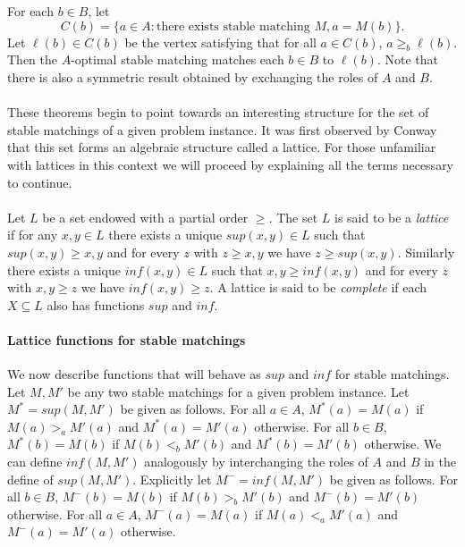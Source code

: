 \begin{corollary}For each $b \in B$, let $$C(b) = \{a \in A: \text{there exists stable matching }M, a = M(b)\}.$$ Let $\ell(b) \in C(b)$  be the vertex satisfying that for all $a \in C(b)$, $a \geq_b \ell(b)$. Then the $A$-optimal stable matching matches each $b \in B$ to $\ell(b)$. Note that there is also a symmetric result obtained by exchanging the roles of $A$ and $B$.
\end{corollary}

\paragraph{}
These theorems begin to point towards an interesting structure for the set of stable matchings of a given problem instance. It was first observed by Conway \cite{knuthmariages} that this set forms an algebraic structure called a lattice. For those unfamiliar with lattices in this context we will proceed by explaining all the terms necessary to continue.

\paragraph{}Let $L$ be a set endowed with a partial order $\geq$. The set $L$ is said to be a {\it lattice} if for any $x, y \in L$ there exists a unique $sup(x,y) \in L$ such that $sup(x,y) \geq x,y$ and for every $z$ with $z \geq x,y$ we have $z \geq sup(x,y)$. Similarly there exists a unique $inf(x,y) \in L$ such that $x,y \geq inf(x,y)$ and for every $z$ with $x,y \geq z$ we have $inf(x,y) \geq z$. A lattice is said to be {\it complete} if each $X \subseteq L$ also has functions $sup$ and $inf$. 

\paragraph{Lattice functions for stable matchings} We now describe functions that will behave as $sup$ and $inf$ for stable matchings. Let $M, M'$ be any two stable matchings for a given problem instance. Let $M^* = sup(M,M')$ be given as follows. For all $a \in A$, $M^*(a) = M(a)$ if $M(a) >_a M'(a)$ and $M^*(a) = M'(a)$ otherwise. For all $b \in B$, $M^*(b) = M(b)$ if $M(b) <_b M'(b)$ and $M^*(b) = M'(b)$ otherwise. We can define $inf(M,M')$ analogously by interchanging the roles of $A$ and $B$ in the define of $sup(M,M')$. Explicitly let $M^- = inf(M,M')$ be given as follows. For all $b \in B$, $M^-(b) = M(b)$ if $M(b) >_b M'(b)$ and $M^-(b) = M'(b)$ otherwise. For all $a \in A$, $M^-(a) = M(a)$ if $M(a) <_a M'(a)$ and $M^-(a) = M'(a)$ otherwise.
